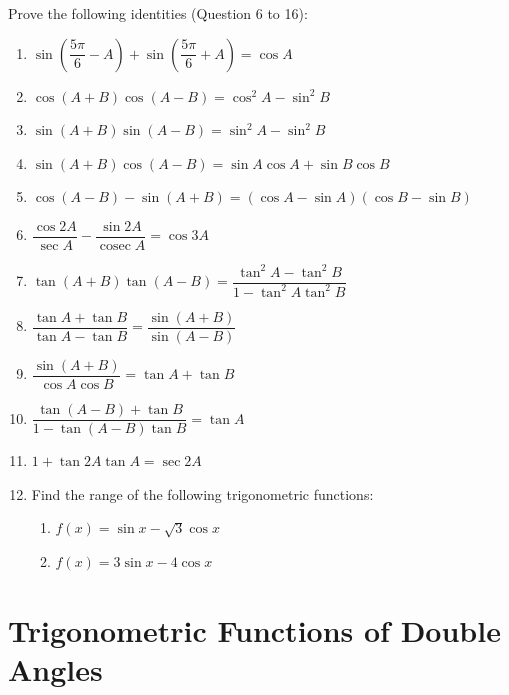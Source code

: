 \documentclass{report}
\begin{document}
Prove the following identities (Question 6 to 16):
\vspace{-1em}
\begin{enumerate}[start=6]
	\item $\sin \left(\dfrac{5 \pi}{6}-A\right)+\sin \left(\dfrac{5 \pi}{6}+A\right)=\cos A$
	\item $\cos (A+B) \cos (A-B)=\cos ^2 A-\sin ^2 B$
	\item $\sin (A+B) \sin (A-B)=\sin ^2 A-\sin ^2 B$
	\item $\sin (A+B) \cos (A-B)=\sin A \cos A+\sin B \cos B$
	\item $\cos (A-B)-\sin (A+B)=(\cos A-\sin A)(\cos B-\sin B)$
	\item $\dfrac{\cos 2 A}{\sec A}-\dfrac{\sin 2 A}{\operatorname{cosec} A}=\cos 3 A$
	\item $\tan (A+B) \tan (A-B)=\dfrac{\tan ^2 A-\tan ^2 B}{1-\tan ^2 A \tan ^2 B}$
	\item $\dfrac{\tan A+\tan B}{\tan A-\tan B}=\dfrac{\sin (A+B)}{\sin (A-B)}$
	\item $\dfrac{\sin (A+B)}{\cos A \cos B}=\tan A+\tan B$
	\item $\dfrac{\tan (A-B)+\tan B}{1-\tan (A-B) \tan B}=\tan A$
	\item $1+\tan 2 A \tan A=\sec 2 A$
	\item Find the range of the following trigonometric functions:
	      \begin{enumerate}[label=(\alph*)]
	      	\item $f(x)=\sin x-\sqrt{3} \cos x$
	      	\item $f(x)=3 \sin x-4 \cos x$
	      \end{enumerate}
\end{enumerate}

\section{Trigonometric Functions of Double Angles}
\end{document}
